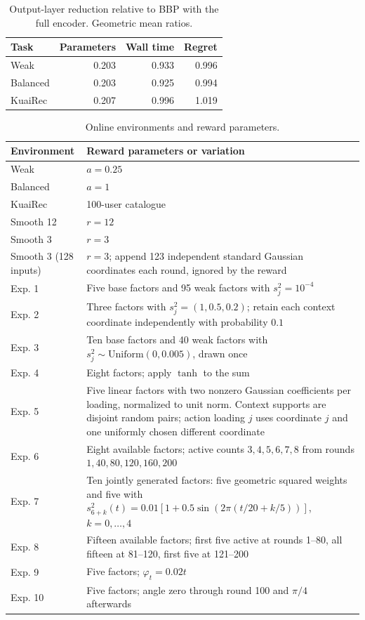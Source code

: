 \begin{table}[htbp]
\centering\small
\caption{Output-layer reduction relative to BBP with the full encoder. Geometric mean ratios.}
\label{tab:network-cost}
\begin{tabular}{@{}lrrr@{}}
\toprule
Task & Parameters & Wall time & Regret \\
\midrule
Weak & 0.203 & 0.933 & 0.996 \\
Balanced & 0.203 & 0.925 & 0.994 \\
KuaiRec & 0.207 & 0.996 & 1.019 \\
\bottomrule
\end{tabular}
\end{table}

\begin{table}[htbp]
\centering\small
\caption{Online environments and reward parameters.}
\label{tab:environments-direct}
\begin{tabular}{@{}p{3.2cm}p{12cm}@{}}
\toprule
Environment & Reward parameters or variation \\
\midrule
Weak & $a=0.25$ \\
Balanced & $a=1$ \\
KuaiRec & 100-user catalogue \\
Smooth 12 & $r=12$ \\
Smooth 3 & $r=3$ \\
Smooth 3 (128 inputs) & $r=3$; append 123 independent standard Gaussian coordinates each round, ignored by the reward \\
Exp. 1 & Five base factors and 95 weak factors with $s_j^2=10^{-4}$ \\
Exp. 2 & Three factors with $s_j^2=(1,0.5,0.2)$; retain each context coordinate independently with probability $0.1$ \\
Exp. 3 & Ten base factors and 40 weak factors with $s_j^2\sim\mathrm{Uniform}(0,0.005)$, drawn once \\
Exp. 4 & Eight factors; apply $\tanh$ to the sum \\
Exp. 5 & Five linear factors with two nonzero Gaussian coefficients per loading, normalized to unit norm. Context supports are disjoint random pairs; action loading $j$ uses coordinate $j$ and one uniformly chosen different coordinate \\
Exp. 6 & Eight available factors; active counts $3,4,5,6,7,8$ from rounds $1,40,80,120,160,200$ \\
Exp. 7 & Ten jointly generated factors: five geometric squared weights and five with $s_{6+k}^2(t)=0.01[1+0.5\sin(2\pi(t/20+k/5))]$, $k=0,\ldots,4$ \\
Exp. 8 & Fifteen available factors; first five active at rounds 1--80, all fifteen at 81--120, first five at 121--200 \\
Exp. 9 & Five factors; $\varphi_t=0.02t$ \\
Exp. 10 & Five factors; angle zero through round 100 and $\pi/4$ afterwards \\
\bottomrule
\end{tabular}
\end{table}

